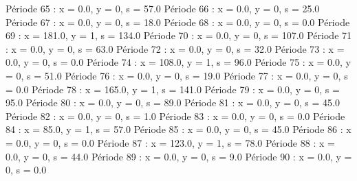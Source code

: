 Période 65 : x = 0.0, y = 0, s = 57.0
Période 66 : x = 0.0, y = 0, s = 25.0
Période 67 : x = 0.0, y = 0, s = 18.0
Période 68 : x = 0.0, y = 0, s = 0.0
Période 69 : x = 181.0, y = 1, s = 134.0
Période 70 : x = 0.0, y = 0, s = 107.0
Période 71 : x = 0.0, y = 0, s = 63.0
Période 72 : x = 0.0, y = 0, s = 32.0
Période 73 : x = 0.0, y = 0, s = 0.0
Période 74 : x = 108.0, y = 1, s = 96.0
Période 75 : x = 0.0, y = 0, s = 51.0
Période 76 : x = 0.0, y = 0, s = 19.0
Période 77 : x = 0.0, y = 0, s = 0.0
Période 78 : x = 165.0, y = 1, s = 141.0
Période 79 : x = 0.0, y = 0, s = 95.0
Période 80 : x = 0.0, y = 0, s = 89.0
Période 81 : x = 0.0, y = 0, s = 45.0
Période 82 : x = 0.0, y = 0, s = 1.0
Période 83 : x = 0.0, y = 0, s = 0.0
Période 84 : x = 85.0, y = 1, s = 57.0
Période 85 : x = 0.0, y = 0, s = 45.0
Période 86 : x = 0.0, y = 0, s = 0.0
Période 87 : x = 123.0, y = 1, s = 78.0
Période 88 : x = 0.0, y = 0, s = 44.0
Période 89 : x = 0.0, y = 0, s = 9.0
Période 90 : x = 0.0, y = 0, s = 0.0


